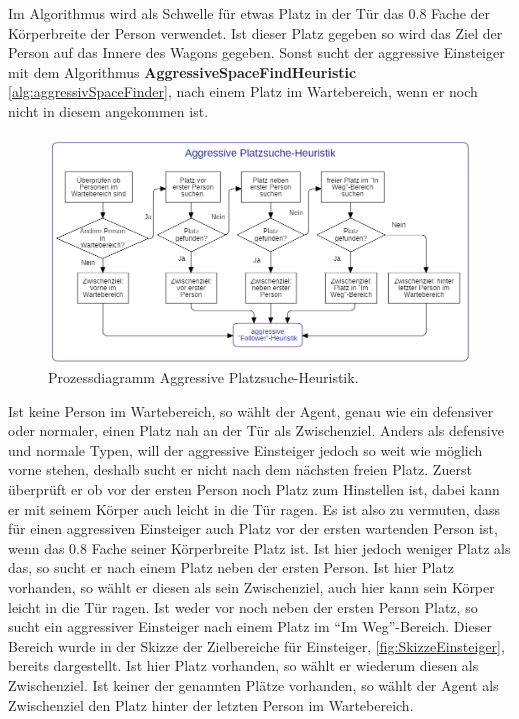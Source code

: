 Im Algorithmus wird als Schwelle für etwas Platz in der Tür das 0.8 Fache der Körperbreite der Person verwendet. Ist dieser Platz gegeben so wird das Ziel der Person auf das Innere des Wagons gegeben. Sonst sucht der aggressive Einsteiger mit dem Algorithmus \textbf{AggressiveSpaceFindHeuristic} \ref{alg:aggressivSpaceFinder}, nach einem Platz im Wartebereich, wenn er noch nicht in diesem angekommen ist.

\begin{figure}[H]
	\centering
		\includegraphics[width=1.0\textwidth]{pictures/model/algorithm/boarding/aggressive_boarding/aggressive_space_find_heuristic.png}
	\caption{Prozessdiagramm Aggressive Platzsuche-Heuristik.}
	\label{fig:APH}
\end{figure}
Ist keine Person im Wartebereich, so wählt der Agent, genau wie ein defensiver oder normaler, einen Platz nah an der Tür als Zwischenziel. Anders als defensive und normale Typen, will der aggressive Einsteiger jedoch so weit wie möglich vorne stehen, deshalb sucht er nicht nach dem nächsten freien Platz. Zuerst überprüft er ob vor der ersten Person noch Platz zum Hinstellen ist, dabei kann er mit seinem Körper auch leicht in die Tür ragen. Es ist also zu vermuten, dass für einen aggressiven Einsteiger auch Platz vor der ersten wartenden Person ist, wenn das  0.8 Fache seiner Körperbreite Platz ist. Ist hier jedoch weniger Platz als das, so sucht er nach einem Platz neben der ersten Person. Ist hier Platz vorhanden, so wählt er diesen als sein Zwischenziel, auch hier kann sein Körper leicht in die Tür ragen. Ist weder vor noch neben der ersten Person Platz, so sucht ein aggressiver Einsteiger nach einem Platz im "`Im Weg"'-Bereich. Dieser Bereich wurde in der Skizze der Zielbereiche für Einsteiger, \figurename \ref{fig:SkizzeEinsteiger}, bereits dargestellt. Ist hier Platz vorhanden, so wählt er wiederum diesen als Zwischenziel. Ist keiner der genannten Plätze vorhanden, so wählt der Agent als Zwischenziel den Platz hinter der letzten Person im Wartebereich. 

